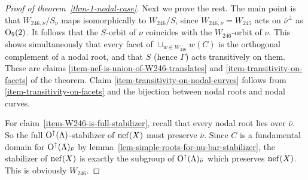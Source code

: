 \documentclass[12pt]{amsart}
\def\nef{\mathop{\rm nef}\nolimits}
\def\Orth{{\rm O}}
\def\Oup{\Orth^{\uparrow}}
\def\nubar{{\bar{\nu}}}
\numberwithin{theorem}{section}
\numberwithin{equation}{section}
\numberwithin{figure}{section}
\theoremstyle{remark}
\begin{document}
\begin{proof}[Proof of theorem~\ref{thm-1-nodal-case}]
Next we prove the rest.  The main point is that $W_{246,\nu}/S_\nu$
maps isomorphically to $W_{246}/S$, since $W_{246,\nu}=W_{245}$ acts
on $\nubar^\perp$ as $\Orth_9(2)$.  It follows that the $S$-orbit of
$\nu$ coincides with the $W_{246}$-orbit of $\nu$.  This shows
simultaneously that every facet of $\cup_{w\in W_{246}}w(C)$ is the
orthogonal complement of a nodal root, and that $S$ (hence $\Gamma$)
acts transitively on them.  These are claims
\eqref{item-nef-is-union-of-W246-translates} and
\eqref{item-transitivity-on-facets} of the theorem.
Claim \eqref{item-transitivity-on-nodal-curves} follows from
\eqref{item-transitivity-on-facets} and the bijection between nodal roots and
nodal curves.

For claim~\eqref{item-W246-is-full-stabilizer}, recall that every
nodal root lies over $\nubar$.  So the full $\Oup(\Lambda)$-stabilizer
of $\nef(X)$ must preserve $\nubar$.  Since $C$ is a fundamental
domain for $\Oup(\Lambda)_\nubar$ by
lemma~\ref{lem-simple-roots-for-nu-bar-stabilizer}, the stabilizer of
$\nef(X)$ is exactly the subgroup of $\Oup(\Lambda)_\nubar$ which
preserves $\nef(X)$. This is obviously $W_{246}$.
\end{proof}
\end{document}
